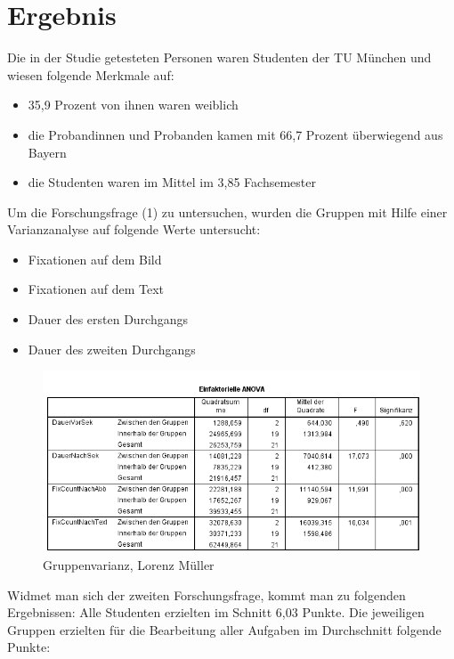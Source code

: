 \chapter{Ergebnis}

Die in der Studie getesteten Personen waren Studenten der TU München und wiesen folgende Merkmale auf:

    \begin{itemize}
        \item 35,9 Prozent von ihnen waren weiblich 
        \item die Probandinnen und Probanden kamen mit 66,7 Prozent überwiegend aus Bayern
        \item die Studenten waren im Mittel im 3,85 Fachsemester
    \end{itemize}

 Um die Forschungsfrage (1) zu untersuchen, wurden die Gruppen mit Hilfe einer Varianzanalyse auf folgende Werte untersucht:
    \begin{itemize}
        \item Fixationen auf dem Bild 
        \item Fixationen auf dem Text
        \item Dauer des ersten Durchgangs
        \item Dauer des zweiten Durchgangs 
    \end{itemize}

\begin{figure}[H]
\noindent\hspace{0.5mm}\includegraphics[width=15cm]{./Ressourcen/Gruppenunterscheidung.png}
\caption{Gruppenvarianz, Lorenz Müller}
\end{figure}

Widmet man sich der zweiten Forschungsfrage, kommt man zu folgenden Ergebnissen:
Alle Studenten erzielten im Schnitt 6,03 Punkte. 
Die jeweiligen Gruppen erzielten für die Bearbeitung aller Aufgaben im Durchschnitt folgende Punkte:

